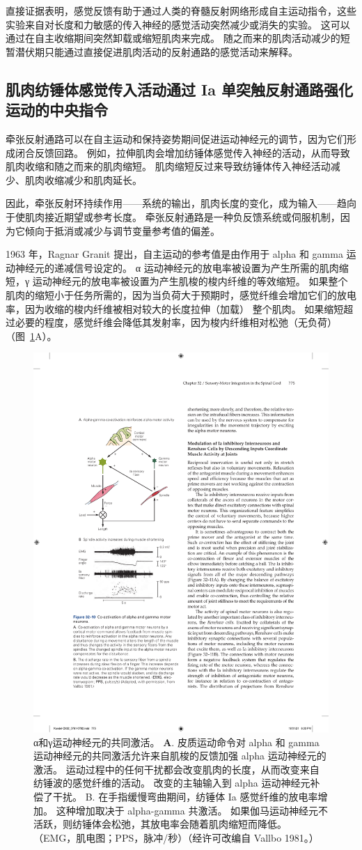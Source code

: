 直接证据表明，感觉反馈有助于通过人类的脊髓反射网络形成自主运动指令，这些实验来自对长度和力敏感的传入神经的感觉活动突然减少或消失的实验。
这可以通过在自主收缩期间突然卸载或缩短肌肉来完成。
随之而来的肌肉活动减少的短暂潜伏期只能通过直接促进肌肉活动的反射通路的感觉活动来解释。



\subsection{肌肉纺锤体感觉传入活动通过 Ia 单突触反射通路强化运动的中央指令}

牵张反射通路可以在自主运动和保持姿势期间促进运动神经元的调节，因为它们形成闭合反馈回路。
例如，拉伸肌肉会增加纺锤体感觉传入神经的活动，从而导致肌肉收缩和随之而来的肌肉缩短。
肌肉缩短反过来导致纺锤体传入神经活动减少、肌肉收缩减少和肌肉延长。


因此，牵张反射环持续作用——系统的输出，肌肉长度的变化，成为输入——趋向于使肌肉接近期望或参考长度。
牵张反射通路是一种负反馈系统或伺服机制，因为它倾向于抵消或减少与调节变量参考值的偏差。


1963 年，Ragnar Granit 提出，自主运动的参考值是由作用于 alpha 和 gamma 运动神经元的递减信号设定的。
α 运动神经元的放电率被设置为产生所需的肌肉缩短，γ 运动神经元的放电率被设置为产生肌梭的梭内纤维的等效缩短。
如果整个肌肉的缩短小于任务所需的，因为当负荷大于预期时，感觉纤维会增加它们的放电率，因为收缩的梭内纤维被相对较大的长度拉伸（加载） 整个肌肉。
如果缩短超过必要的程度，感觉纤维会降低其发射率，因为梭内纤维相对松弛（无负荷）（图~\ref{fig:32_10}A）。


\begin{figure}[htbp]
	\centering
	\includegraphics[width=0.5\linewidth]{chap32/fig_32_10}
	\caption{α和γ运动神经元的共同激活。
	\textbf{A}. 皮质运动命令对 alpha 和 gamma 运动神经元的共同激活允许来自肌梭的反馈加强 alpha 运动神经元的激活。
	运动过程中的任何干扰都会改变肌肉的长度，从而改变来自纺锤波的感觉纤维的活动。
	改变的主轴输入到 alpha 运动神经元补偿了干扰。
	B. 在手指缓慢弯曲期间，纺锤体 Ia 感觉纤维的放电率增加。
	这种增加取决于 alpha-gamma 共激活。
	如果伽马运动神经元不活跃，则纺锤体会松弛，其放电率会随着肌肉缩短而降低。 （EMG，肌电图；PPS，脉冲/秒）（经许可改编自 Vallbo 1981。）}
	\label{fig:32_10}
\end{figure}


